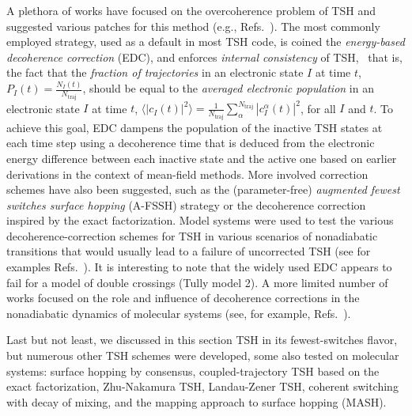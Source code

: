 \documentclass[9pt,bestpractices,pubversion]{livecoms}
\begin{document}
A plethora of works have focused on the overcoherence problem of TSH and suggested various patches for this method (e.g., Refs.~).
The most commonly employed strategy, used as a default in most TSH code, is coined the \textit{energy-based decoherence correction} (EDC),\cite{granucci2010including} and enforces \textit{internal consistency} of TSH,~\cite{fang99b,Granucci2007} that is, the fact that the \textit{fraction of trajectories} in an electronic state $I$ at time $t$, $P_I(t) = \frac{N_I(t)}{N_{\text{traj}}}$, should be equal to the \textit{averaged electronic population} in an electronic state $I$ at time $t$, $\langle|c_I(t)|^2\rangle=\frac{1}{N_{\text{traj}}}\sum_\alpha^{N_{\text{traj}}} |c_I^\alpha(t)|^2$, for all $I$ and $t$. To achieve this goal, EDC dampens the population of the inactive TSH states at each time step using a decoherence time that is deduced from the electronic energy difference between each inactive state and the active one based on earlier derivations in the context of mean-field methods.\cite{Zhu2004} More involved correction schemes have also been suggested, such as the (parameter-free) \textit{augmented fewest switches surface hopping} (A-FSSH) strategy\cite{subotnik2011new,subotnik2011fewest,subotnik2016understanding} or the decoherence correction inspired by the exact factorization.\cite{min2018decoh} 
Model systems were used to test the various decoherence-correction schemes for TSH in various scenarios of nonadiabatic transitions that would usually lead to a failure of uncorrected TSH (see for examples Refs.~). It is interesting to note that the widely used EDC appears to fail for a model of double crossings (Tully model 2).\cite{falkissueedc2014} A more limited number of works focused on the role and influence of decoherence corrections in the nonadiabatic dynamics of molecular systems (see, for example, Refs.~).

Last but not least, we discussed in this section TSH in its fewest-switches flavor, but numerous other TSH schemes were developed, some also tested on molecular systems: surface hopping by consensus,\cite{martens2016surface} coupled-trajectory TSH based on the exact factorization,\cite{pieronicttsh2021} Zhu-Nakamura TSH,\cite{zhunakatsh2001,zhunakatsh2006} Landau-Zener TSH,\cite{slavicek2020} coherent switching with decay of mixing,\cite{Zhu2004,shu2020CSDMsharc} and the mapping approach to surface hopping (MASH).\cite{Mannouch2023,richardson2025mash}
\end{document}
